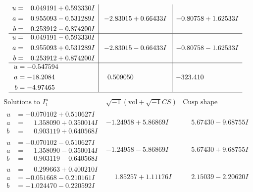 \documentclass[1p]{elsarticle_modified}
\theoremstyle{definition}
\newcommand{\I}{\sqrt{-1}}
\begin{document}
$$\begin{array}{c|c|c}
\begin{aligned}
u &= \phantom{-}0.049191 + 0.593330 I \\
a &= \phantom{-}0.955093 - 0.531289 I \\
b &= \phantom{-}0.253912 - 0.874200 I\end{aligned}
 & -2.83015 + 0.66433 I & -0.80758 + 1.62533 I \\ \hline\begin{aligned}
u &= \phantom{-}0.049191 - 0.593330 I \\
a &= \phantom{-}0.955093 + 0.531289 I \\
b &= \phantom{-}0.253912 + 0.874200 I\end{aligned}
 & -2.83015 - 0.66433 I & -0.80758 - 1.62533 I \\ \hline\begin{aligned}
u &= -0.547594\phantom{ +0.000000I} \\
a &= -18.2084\phantom{ +0.000000I} \\
b &= -4.97465\phantom{ +0.000000I}\end{aligned}
 & \phantom{-}0.509050\phantom{ +0.000000I} & -323.410\phantom{ +0.000000I}\\
 \hline 
 \end{array}$$\newpage$$\begin{array}{c|c|c}  
\text{Solutions to }I^u_{1}& \I (\text{vol} + \sqrt{-1}CS) & \text{Cusp shape}\\
 \hline 
\begin{aligned}
u &= -0.070102 + 0.510627 I \\
a &= \phantom{-}1.358090 + 0.350014 I \\
b &= \phantom{-}0.903119 + 0.640568 I\end{aligned}
 & -1.24958 + 5.86869 I & \phantom{-}5.67430 - 9.68755 I \\ \hline\begin{aligned}
u &= -0.070102 - 0.510627 I \\
a &= \phantom{-}1.358090 - 0.350014 I \\
b &= \phantom{-}0.903119 - 0.640568 I\end{aligned}
 & -1.24958 - 5.86869 I & \phantom{-}5.67430 + 9.68755 I \\ \hline\begin{aligned}
u &= \phantom{-}0.299663 + 0.400210 I \\
a &= -0.051668 - 0.210161 I \\
b &= -1.024470 - 0.220592 I\end{aligned}
 & \phantom{-}1.85257 + 1.11176 I & \phantom{-}2.15039 - 2.20620 I \\ \hline\begin{aligned}

\end{aligned}
\end{array}$$
\end{document}

